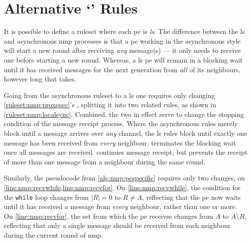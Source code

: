 \section{\label{sec:nmp:localsync}Alternative `' Rules}
It is possible to define a \gls{ruleset} where each \gls{pe} is \emph{\gls{ls}}.  The difference between the \gls{ls} and asynchronous \gls{nmp} processes is that a \gls{pe} working in the asynchronous style will start a new round after receiving \emph{any} message(s) --- it only needs to receive one before starting a new round.  Whereas, a \gls{ls} \gls{pe} will remain in a blocking wait until it has received messages for the next generation from \emph{all} of its neighbours, however long that takes.

Going from the asynchronous \gls{ruleset} to a \gls{ls} one requires only changing \cref{ruleset:nmp:proxspec}'s , splitting it into two related rules, as shown in \cref{ruleset:nmp:localsync}.  Combined, the two in effect serve to change the stopping condition of the message receipt process.  Where the asynchronous rules merely block until a message arrives over \emph{any} channel, the \gls{ls} rules block until exactly one message has been received from \emph{every} neighbour.   terminates the blocking wait once all messages are received.   continues message receipt, but prevents the receipt of more than one message from a neighbour during the same round.

Similarly, the pseudocode from \cref{alg:nmp:pespecific} requires only two changes, on \cref{line:nmp:recvwhile,line:nmp:recvfor}.  On \cref{line:nmp:recvwhile}, the condition for the \texttt{while} loop changes from \(|R| = 0\) to \(R \not= A\), reflecting that the \gls{pe} now waits until it has received a message from \emph{every} neighbour, rather than one or more.  On \cref{line:nmp:recvfor}, the set from which the \gls{pe} receives changes from \(A\) to \(A \setminus R\), reflecting that only a single message should be received from each neighbour during the current round of \gls{nmp}.

